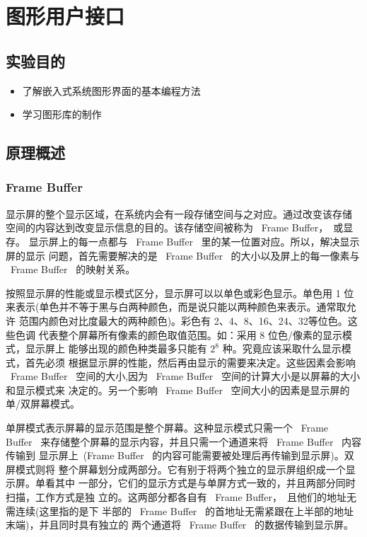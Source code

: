 \chapter{图形用户接口}

\section{实验目的}
\begin{itemize}\itemsep=-3pt
  \item 了解嵌入式系统图形界面的基本编程方法
  \item 学习图形库的制作
\end{itemize}

\section{原理概述}
\subsection{Frame Buffer}
	显示屏的整个显示区域，在系统内会有一段存储空间与之对应。通过改变该存储
空间的内容达到改变显示信息的目的。该存储空间被称为 ~Frame Buffer，~或显存。
显示屏上的每一点都与 ~Frame Buffer~ 里的某一位置对应。所以，解决显示屏的显示
问题，首先需要解决的是 ~Frame Buffer~ 的大小以及屏上的每一像素与 ~Frame
Buffer~ 的映射关系。

	按照显示屏的性能或显示模式区分，显示屏可以以单色或彩色显示。单色用 1 位
来表示(单色并不等于黑与白两种颜色，而是说只能以两种颜色来表示。通常取允许
范围内颜色对比度最大的两种颜色)。彩色有 2、4、8、16、24、32等位色。这些色调
代表整个屏幕所有像素的颜色取值范围。如：采用 8 位色/像素的显示模式，显示屏上
能够出现的颜色种类最多只能有 $2^8$ 种。究竟应该采取什么显示模式，首先必须
根据显示屏的性能，然后再由显示的需要来决定。这些因素会影响 ~Frame Buffer~
空间的大小,因为 ~Frame Buffer~ 空间的计算大小是以屏幕的大小和显示模式来
决定的。另一个影响 ~Frame Buffer~ 空间大小的因素是显示屏的单/双屏幕模式。

	单屏模式表示屏幕的显示范围是整个屏幕。这种显示模式只需一个 ~Frame Buffer~
来存储整个屏幕的显示内容，并且只需一个通道来将 ~Frame Buffer~ 内容传输到
显示屏上~(Frame Buffer~ 的内容可能需要被处理后再传输到显示屏)。双屏模式则将
整个屏幕划分成两部分。它有别于将两个独立的显示屏组织成一个显示屏。单看其中
一部分，它们的显示方式是与单屏方式一致的，并且两部分同时扫描，工作方式是独
立的。这两部分都各自有 ~Frame Buffer，~且他们的地址无需连续(这里指的是下
半部的 ~Frame Buffer~ 的首地址无需紧跟在上半部的地址末端)，并且同时具有独立的
两个通道将 ~Frame Buffer~ 的数据传输到显示屏。

